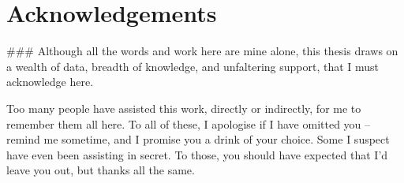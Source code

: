 \documentclass[11pt,a4paper,final,twoside]{memoir}
\begin{document}
\chapter*{Acknowledgements}
###
Although all the words and work here are mine alone, this thesis draws on a wealth of data, breadth of knowledge, and unfaltering support, that I must acknowledge here.  

Too many people have assisted this work, directly or indirectly, for me to remember them all here.  To all of these, I apologise if I have omitted you -- remind me sometime, and I promise you a drink of your choice.  Some I suspect have even been assisting in secret.  To those, you should have expected that I'd leave you out, but thanks all the same.



\thispagestyle{empty}
\clearpage

\begin{abstract}
###
\end{abstract}
\thispagestyle{empty}
\clearpage


\setcounter{tocdepth}{2}
\tableofcontents
\clearpage

\listoffigures
\clearpage

\listoftables

\listofalgorithms

\openany




\mainmatter
\openright
\pagestyle{headings}





%




\backmatter

\printglossary

\renewcommand{\bibname}{References}


\end{document}

